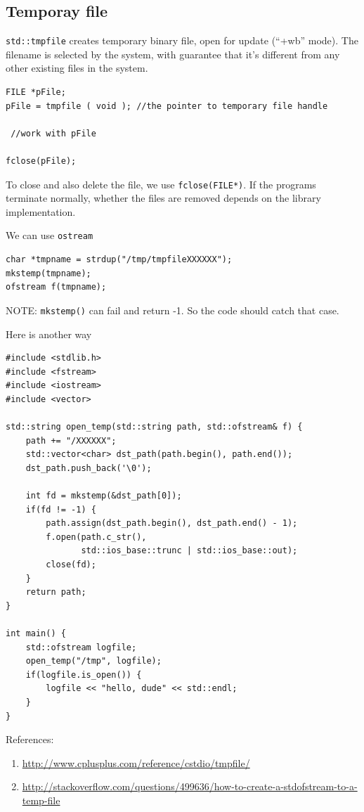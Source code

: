 \subsection{Temporay file}
\label{sec:temporary_file}

\verb!std::tmpfile! creates temporary binary file, open for update (``+wb''
mode). The filename is selected by the system, with guarantee that it's
different from any other existing files in the system.
\begin{verbatim}
FILE *pFile;
pFile = tmpfile ( void ); //the pointer to temporary file handle
 
 //work with pFile

fclose(pFile);
\end{verbatim}

To close and also delete the file, we use \verb!fclose(FILE*)!.  If the programs
terminate normally, whether the files are removed depends on the
library implementation.


We can use \verb!ostream!
\begin{verbatim}
char *tmpname = strdup("/tmp/tmpfileXXXXXX");
mkstemp(tmpname);
ofstream f(tmpname);
\end{verbatim}
NOTE: \verb!mkstemp()! can fail and return -1. So the code should catch that
case.

Here is another way
\begin{verbatim}
#include <stdlib.h>
#include <fstream>
#include <iostream>
#include <vector>

std::string open_temp(std::string path, std::ofstream& f) {
    path += "/XXXXXX";
    std::vector<char> dst_path(path.begin(), path.end());
    dst_path.push_back('\0');

    int fd = mkstemp(&dst_path[0]);
    if(fd != -1) {
        path.assign(dst_path.begin(), dst_path.end() - 1);
        f.open(path.c_str(), 
               std::ios_base::trunc | std::ios_base::out);
        close(fd);
    }
    return path;
}

int main() {
    std::ofstream logfile;
    open_temp("/tmp", logfile);
    if(logfile.is_open()) {
        logfile << "hello, dude" << std::endl;
    }
}
\end{verbatim}

References:
\begin{enumerate}
  \item \url{http://www.cplusplus.com/reference/cstdio/tmpfile/}
  
  \item
  \url{http://stackoverflow.com/questions/499636/how-to-create-a-stdofstream-to-a-temp-file}
\end{enumerate}

